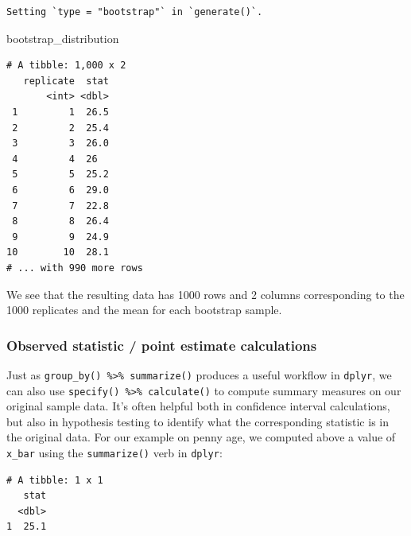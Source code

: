\documentclass[12pt, krantz2,]{krantz}
\makeatletter
\newenvironment{Shaded}{\begin{snugshade}}{\end{snugshade}}
\newcommand{\DataTypeTok}[1]{\textcolor[rgb]{0.27,0.27,0.27}{#1}}
\newcommand{\DecValTok}[1]{\textcolor[rgb]{0.06,0.06,0.06}{#1}}
\newcommand{\KeywordTok}[1]{\textcolor[rgb]{0.27,0.27,0.27}{\textbf{#1}}}
\newcommand{\NormalTok}[1]{#1}
\newcommand{\OperatorTok}[1]{\textcolor[rgb]{0.43,0.43,0.43}{\textbf{#1}}}
\newcommand{\StringTok}[1]{\textcolor[rgb]{0.5,0.5,0.5}{#1}}
\newenvironment{kframe}{%
\medskip{}
\setlength{\fboxsep}{.8em}
 \def\at@end@of@kframe{}%
 \ifinner\ifhmode%
  \def\at@end@of@kframe{\end{minipage}}%
  \begin{minipage}{\columnwidth}%
 \fi\fi%
 \def\FrameCommand##1{\hskip\@totalleftmargin \hskip-\fboxsep
 \colorbox{shadecolor}{##1}\hskip-\fboxsep
     \hskip-\linewidth \hskip-\@totalleftmargin \hskip\columnwidth}%
 \MakeFramed {\advance\hsize-\width
   \@totalleftmargin\z@ \linewidth\hsize
   \@setminipage}}%
 {\par\unskip\endMakeFramed%
 \at@end@of@kframe}
\renewenvironment{Shaded}{\begin{kframe}}{\end{kframe}}
\makeatother
\begin{document}
\begin{verbatim}
Setting `type = "bootstrap"` in `generate()`.
\end{verbatim}

\begin{Shaded}
\begin{Highlighting}[]
\NormalTok{bootstrap_distribution}
\end{Highlighting}
\end{Shaded}

\begin{verbatim}
# A tibble: 1,000 x 2
   replicate  stat
       <int> <dbl>
 1         1  26.5
 2         2  25.4
 3         3  26.0
 4         4  26  
 5         5  25.2
 6         6  29.0
 7         7  22.8
 8         8  26.4
 9         9  24.9
10        10  28.1
# ... with 990 more rows
\end{verbatim}

We see that the resulting data has 1000 rows and 2 columns corresponding to the 1000 replicates and the mean for each bootstrap sample.

\hypertarget{observed-statistic-point-estimate-calculations}{%
\subsubsection*{Observed statistic / point estimate calculations}\label{observed-statistic-point-estimate-calculations}}


Just as \texttt{group\_by()\ \%\textgreater{}\%\ summarize()} produces a useful workflow in \texttt{dplyr}, we can also use \texttt{specify()\ \%\textgreater{}\%\ calculate()} to compute summary measures on our original sample data. It's often helpful both in confidence interval calculations, but also in hypothesis testing to identify what the corresponding statistic is in the original data. For our example on penny age, we computed above a value of \texttt{x\_bar} using the \texttt{summarize()} verb in \texttt{dplyr}:

\begin{Shaded}
\end{Shaded}

\begin{verbatim}
# A tibble: 1 x 1
   stat
  <dbl>
1  25.1
\end{verbatim}
\end{document}
